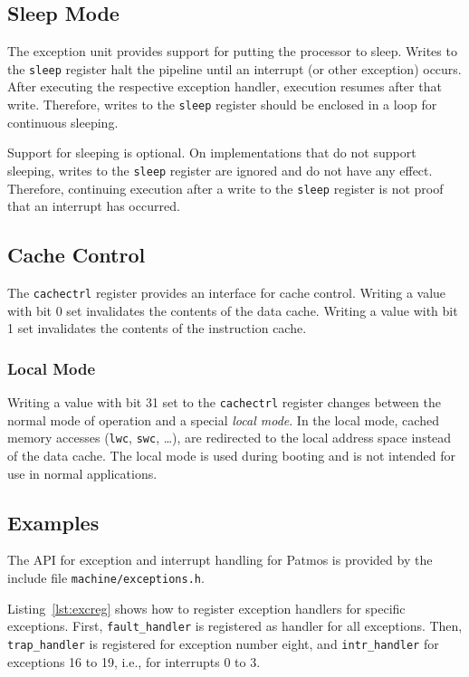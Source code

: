 \documentclass[a4paper,fontsize=10pt,twoside,DIV15,BCOR12mm,headinclude=true,footinclude=false,pagesize,bibtotoc]{scrbook}
\begin{document}
\subsection{Sleep Mode}

The exception unit provides support for putting the processor to
sleep. Writes to the \texttt{sleep} register halt the pipeline until
an interrupt (or other exception) occurs. After executing the
respective exception handler, execution resumes after that
write. Therefore, writes to the \texttt{sleep} register should be
enclosed in a loop for continuous sleeping.

Support for sleeping is optional. On implementations that do not
support sleeping, writes to the \texttt{sleep} register are ignored
and do not have any effect. Therefore, continuing execution after a
write to the \texttt{sleep} register is not proof that an interrupt
has occurred.

\subsection{Cache Control}
\label{sec:cachectrl}

The \texttt{cachectrl} register provides an interface for cache
control. Writing a value with bit 0 set invalidates the contents of
the data cache. Writing a value with bit 1 set invalidates the
contents of the instruction cache.

\subsubsection{Local Mode}

Writing a value with bit 31 set to the \texttt{cachectrl} register
changes between the normal mode of operation and a special \emph{local
  mode}. In the local mode, cached memory accesses (\texttt{lwc},
\texttt{swc}, \dots), are redirected to the local address space
instead of the data cache. The local mode is used during booting and
is not intended for use in normal applications.

\subsection{Examples}

The API for exception and interrupt handling for Patmos is provided by
the include file \texttt{machine/exceptions.h}.

Listing~\ref{lst:excreg} shows how to register exception handlers for
specific exceptions. First, \texttt{fault\_handler} is registered as
handler for all exceptions. Then, \texttt{trap\_handler} is registered
for exception number eight, and \texttt{intr\_handler} for exceptions
16 to 19, i.e., for interrupts 0 to 3.
\end{document}
